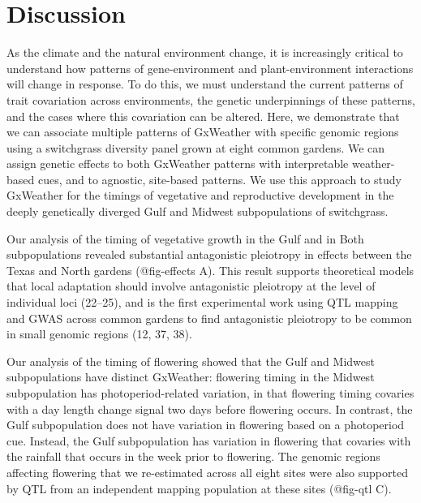 \documentclass[
  9pt,
  twocolumn,
  twoside]{pnas-new}
\begin{document}
\section{Discussion}\label{discussion}

As the climate and the natural environment change, it is increasingly
critical to understand how patterns of gene-environment and
plant-environment interactions will change in response. To do this, we
must understand the current patterns of trait covariation across
environments, the genetic underpinnings of these patterns, and the cases
where this covariation can be altered. Here, we demonstrate that we can
associate multiple patterns of GxWeather with specific genomic regions
using a switchgrass diversity panel grown at eight common gardens. We
can assign genetic effects to both GxWeather patterns with interpretable
weather-based cues, and to agnostic, site-based patterns. We use this
approach to study GxWeather for the timings of vegetative and
reproductive development in the deeply genetically diverged Gulf and
Midwest subpopulations of switchgrass.

Our analysis of the timing of vegetative growth in the Gulf and in Both
subpopulations revealed substantial antagonistic pleiotropy in effects
between the Texas and North gardens (@fig-effects A). This result
supports theoretical models that local adaptation should involve
antagonistic pleiotropy at the level of individual loci (22--25), and is
the first experimental work using QTL mapping and GWAS across common
gardens to find antagonistic pleiotropy to be common in small genomic
regions (12, 37, 38).

Our analysis of the timing of flowering showed that the Gulf and Midwest
subpopulations have distinct GxWeather: flowering timing in the Midwest
subpopulation has photoperiod-related variation, in that flowering
timing covaries with a day length change signal two days before
flowering occurs. In contrast, the Gulf subpopulation does not have
variation in flowering based on a photoperiod cue. Instead, the Gulf
subpopulation has variation in flowering that covaries with the rainfall
that occurs in the week prior to flowering. The genomic regions
affecting flowering that we re-estimated across all eight sites were
also supported by QTL from an independent mapping population at these
sites (@fig-qtl C).
\end{document}
